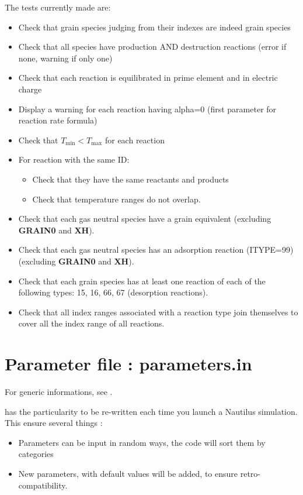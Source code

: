 \documentclass[english,a4paper,twoside]{article}
\begin{document}
The tests currently made are:
\begin{itemize}
\item Check that grain species judging from their indexes are indeed grain species
\item Check that all species have production AND destruction reactions (error if none, warning if only one)
\item Check that each reaction is equilibrated in prime element and in electric charge
\item Display a warning for each reaction having alpha=0 (first parameter for reaction rate formula)
\item Check that $T_\text{min} < T_\text{max}$ for each reaction
\item For reaction with the same ID:
\begin{itemize}
\item Check that they have the same reactants and products
\item Check that temperature ranges do not overlap.
\end{itemize}
\item Check that each gas neutral species have a grain equivalent (excluding \textbf{GRAIN0} and \textbf{XH}).
\item Check that each gas neutral species has an adsorption reaction (ITYPE=99) (excluding \textbf{GRAIN0} and \textbf{XH}).
\item Check that each grain species has at least one reaction of each of the following types: 15, 16, 66, 67 (desorption reactions).
\item Check that all index ranges associated with a reaction type join themselves to cover all the index range of all reactions.
\end{itemize}

\section{Parameter file : parameters.in}\label{sec:parameters_in}
For generic informations, see .

 has the particularity to be re-written each time you launch a Nautilus simulation. This ensure several things :
\begin{itemize}
\item Parameters can be input in random ways, the code will sort them by categories
\item New parameters, with default values will be added, to ensure retro-compatibility.
\end{itemize}
\end{document}
